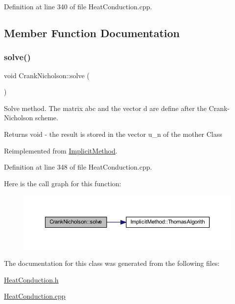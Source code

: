 Definition at line 340 of file Heat\+Conduction.\+cpp.



\subsection{Member Function Documentation}
\mbox{\label{class_crank_nicholson_a2846912cccce367888c37bf0e58f1cb1}} 
\subsubsection{\texorpdfstring{solve()}{solve()}}
{\footnotesize\ttfamily void Crank\+Nicholson\+::solve (\begin{DoxyParamCaption}{ }\end{DoxyParamCaption})\hspace{0.3cm}{\ttfamily [virtual]}}



Solve method. The matrix abc and the vector d are define after the Crank-\/\+Nicholson scheme. 

\begin{DoxyReturn}{Returns}
void -\/ the result is stored in the vector u\+\_\+n of the mother Class 
\end{DoxyReturn}


Reimplemented from \hyperlink{class_implicit_method_ae06909ac3cde1ae9fb216501c852e22c}{Implicit\+Method}.



Definition at line 348 of file Heat\+Conduction.\+cpp.

Here is the call graph for this function\+:\nopagebreak
\begin{figure}[H]
\begin{center}
\leavevmode
\includegraphics[width=350pt]{class_crank_nicholson_a2846912cccce367888c37bf0e58f1cb1_cgraph}
\end{center}
\end{figure}


The documentation for this class was generated from the following files\+:\begin{DoxyCompactItemize}
\item 
\hyperlink{_heat_conduction_8h}{Heat\+Conduction.\+h}\item 
\hyperlink{_heat_conduction_8cpp}{Heat\+Conduction.\+cpp}\end{DoxyCompactItemize}
